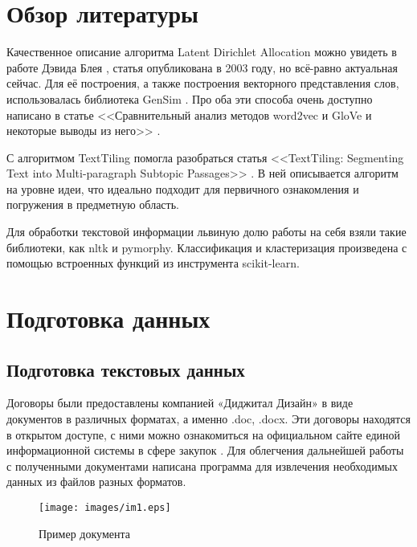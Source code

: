 \documentclass[12pt]{article}
\begin{document}
\newpage
\section*{Обзор литературы}
Качественное описание алгоритма Latent Dirichlet Allocation можно увидеть в работе Дэвида Блея \cite{lda}, статья опубликована в 2003 году, но всё-равно актуальная сейчас. Для её построения, а также построения векторного представления слов, использовалась библиотека GenSim \cite{gensim}. Про оба эти способа очень доступно написано в статье <<Сравнительный анализ методов word2vec и GloVe и некоторые выводы из него>> \cite{maslovskaya}.

С алгоритмом TextTiling помогла разобраться статья <<TextTiling: \linebreak Segmenting Text into Multi-paragraph Subtopic Passages>> \cite{texttiling}. В ней описывается алгоритм на уровне идеи, что идеально подходит для первичного ознакомления и погружения в предметную область. 

Для обработки текстовой информации львиную долю работы на себя взяли такие библиотеки, как nltk и pymorphy. Классификация и кластеризация произведена с помощью встроенных функций из инструмента scikit-learn.


\newpage
\section{Подготовка данных}
\subsection{Подготовка текстовых данных}
Договоры были предоставлены компанией «Диджитал Дизайн» \cite{dd} в виде документов в различных форматах, а именно .doc, .docx. Эти договоры находятся в открытом доступе, с ними можно ознакомиться на официальном сайте единой информационной системы в сфере закупок \cite{zakupki}. Для облегчения дальнейшей работы с полученными документами написана программа для извлечения необходимых данных из файлов разных форматов. 

\vspace{5pt}
\begin{figure}[h]
	\texttt{[image: images/im1.eps]}
	\caption{Пример документа}
	\label{im1}
\end{figure}
\vspace{5pt}
\end{document}
